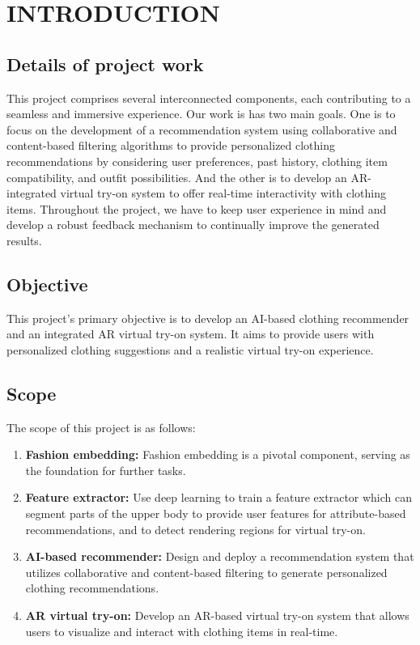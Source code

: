 \chapter{INTRODUCTION}

\section{Details of project work}
	This project comprises several interconnected components, each contributing to a seamless and immersive experience. Our work is has two main goals. One is to focus on the development of a recommendation system using collaborative and content-based filtering algorithms to provide personalized clothing recommendations by considering user preferences, past history, clothing item compatibility, and outfit possibilities. And the other is to develop an AR-integrated virtual try-on system to offer real-time interactivity with clothing items. Throughout the project, we have to keep user experience in mind and develop a robust feedback mechanism to continually improve the generated results.

\section{Objective}
	This project's primary objective is to develop an AI-based clothing recommender and an integrated AR virtual try-on system. It aims to provide users with personalized clothing suggestions and a realistic virtual try-on experience.

\section{Scope}
	The scope of this project is as follows:

	\begin{enumerate}
		\item \textbf{Fashion embedding:} Fashion embedding is a pivotal component, serving as the foundation for further tasks.
		\item \textbf{Feature extractor:} Use deep learning to train a feature extractor which can segment parts of the upper body to provide user features for attribute-based recommendations, and to detect rendering regions for virtual try-on.
		\item \textbf{AI-based recommender:} Design and deploy a recommendation system that utilizes collaborative and content-based filtering to generate personalized clothing recommendations.
		\item \textbf{AR virtual try-on:} Develop an AR-based virtual try-on system that allows users to visualize and interact with clothing items in real-time.
	\end{enumerate}

